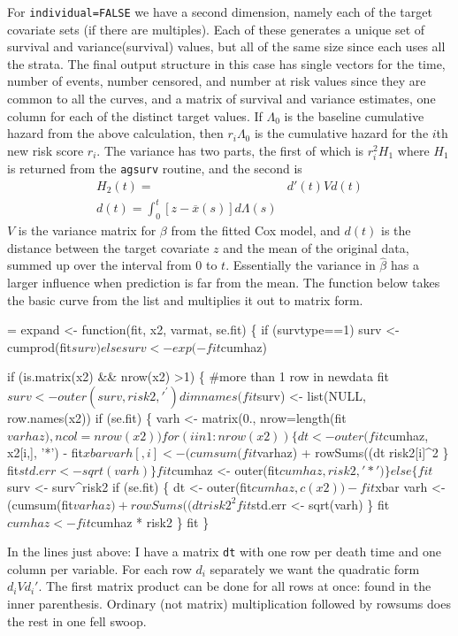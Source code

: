 \documentclass{article}
\newcommand{\code}[1]{\texttt{#1}}
\begin{document}
For \code{individual=FALSE} we have a second dimension, namely each of the
target covariate sets (if there are multiples).  Each of these generates
a unique set of survival and variance(survival) values, but all of the 
same size since each uses all the strata.  The final output structure in
this case has single vectors for the time, number of events, number censored,
and number at risk values since they are common to all the curves, and a
matrix of
survival and variance estimates, one column for each of the
distinct target values.  
If $\Lambda_0$ is the baseline cumulative hazard from the
above calculation, then $r_i \Lambda_0$ is the cumulative
hazard for the $i$th new risk score $r_i$.
The variance has two parts, the first of which is $r_i^2 H_1$ where
$H_1$ is returned from the \code{agsurv} routine, and the second is
\begin{align*}
  H_2(t) =& d'(t) V d(t) \\                                        %
  d(t) = \int_0^t [z- \overline x(s)] d\Lambda(s)
\end{align*}
$V$ is the variance matrix for $\beta$ from the fitted Cox
model, and $d(t)$ is the distance between the 
target covariate $z$ and the mean of the original data,
summed up over the interval from 0 to $t$.
Essentially the variance in $\hat \beta$ has a larger influence
when prediction is far from the mean.
The function below takes the basic curve from the list and multiplies
it out to matrix form.
\begin{nwchunk}
=
 expand <- function(fit, x2, varmat, se.fit) \{
     if (survtype==1) 
         surv <- cumprod(fit$surv)
     else surv <- exp(-fit$cumhaz)
 
     if (is.matrix(x2) && nrow(x2) >1) \{  #more than 1 row in newdata
         fit$surv <- outer(surv, risk2, '^')
         dimnames(fit$surv) <- list(NULL, row.names(x2))
         if (se.fit) \{
             varh <- matrix(0., nrow=length(fit$varhaz), ncol=nrow(x2))
             for (i in 1:nrow(x2)) \{
                 dt <- outer(fit$cumhaz, x2[i,], '*') - fit$xbar
                 varh[,i] <- (cumsum(fit$varhaz) + rowSums((dt %
                     risk2[i]^2
                 \}
             fit$std.err <- sqrt(varh)
             \}
         fit$cumhaz <- outer(fit$cumhaz, risk2, '*')
         \}
     else \{
         fit$surv <- surv^risk2
         if (se.fit) \{
             dt <-  outer(fit$cumhaz, c(x2)) - fit$xbar
             varh <- (cumsum(fit$varhaz) + rowSums((dt %
                 risk2^2
             fit$std.err <- sqrt(varh)
             \}
         fit$cumhaz <- fit$cumhaz * risk2
         \}
     fit
     \}
\end{nwchunk}
In the lines just above: I have a matrix \code{dt} with one row per death
time and one column per variable.  For each row $d_i$ separately we
want the quadratic form $d_i V d_i'$.  The first matrix product can     %
be done for all rows at once: found in the inner parenthesis.
Ordinary (not matrix) multiplication followed by rowsums does the rest
in one fell swoop.
    
\end{document}
